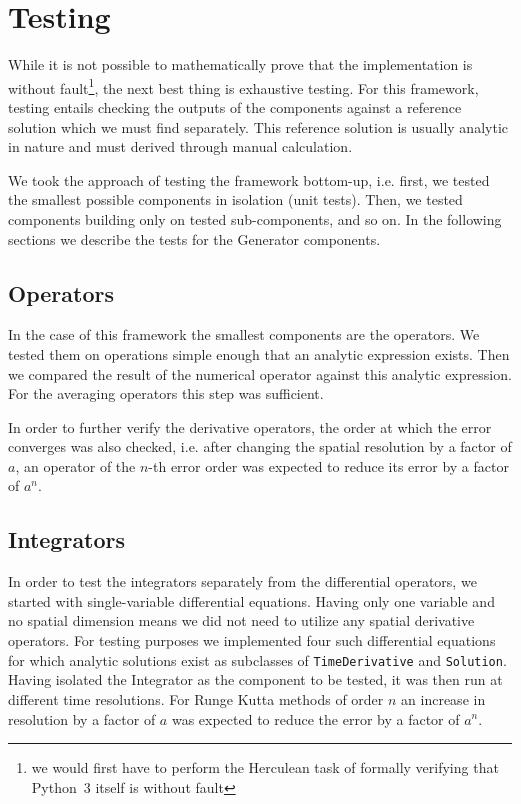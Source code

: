 \section{Testing}\label{sec:testing}
While it is not possible to mathematically prove that the implementation is without fault\footnote{we would first have to perform the Herculean task of formally verifying that Python~3 itself is without fault}, the next best thing is exhaustive testing.
For this framework, testing entails checking the outputs of the components against a reference solution which we must find separately.
This reference solution is usually analytic in nature and must derived through manual calculation.

We took the approach of testing the framework bottom-up, i.e. first, we tested the smallest possible components in isolation (unit tests).
Then, we tested components building only on tested sub-components, and so on.
In the following sections we describe the tests for the Generator components.

\subsection{Operators}
In the case of this framework the smallest components are the operators.
We tested them on operations simple enough that an analytic expression exists.
Then we compared the result of the numerical operator against this analytic expression.
For the averaging operators this step was sufficient.

In order to further verify the derivative operators, the order at which the error converges was also checked, i.e. after changing the spatial resolution by a factor of $a$, an operator of the $n$-th error order was expected to reduce its error by a factor of $a^n$.

\subsection{Integrators}
In order to test the integrators separately from the differential operators, we started with single-variable differential equations.
Having only one variable and no spatial dimension means we did not need to utilize any spatial derivative operators.
For testing purposes we implemented four such differential equations for which analytic solutions exist as subclasses of \texttt{TimeDerivative} and \texttt{Solution}.
Having isolated the Integrator as the component to be tested, it was then run at different time resolutions.
For Runge Kutta methods of order $n$ an increase in resolution by a factor of $a$ was expected to reduce the error by a factor of $a^n$.

